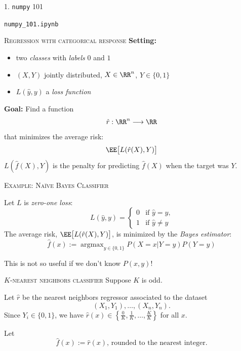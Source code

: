 \documentclass{beamer}
\DeclareMathOperator*{\argmax}{argmax}
\begin{document}
\begin{frame}{\textsc{1.} \texttt{numpy} \textsc{101}}
    
    \begin{center}
        \texttt{numpy\_101.ipynb}
    \end{center}
\end{frame}



\begin{frame}{\textsc{Regression with categorical response}}
    \textbf{Setting:}
    \begin{itemize}
        \item two \emph{classes} with \emph{labels} $0$ and $1$
        \item $(X, Y)$ jointly distributed, $X\in\RR^n$, $Y\in\{0,1\}$
        \item $L(\hat y, y)$ a \emph{loss function}
    \end{itemize}

    \textbf{Goal:}
    Find a function
    \[
        \hat{r}:\RR^n\longrightarrow \RR
    \]
    that minimizes the average risk:
    \[
        \EE\big[ L(\hat r(X), Y)\big]
    \]
    $L(\hat f(X), Y)$ is the penalty for predicting $\hat f(X)$ when the target was $Y$.
\end{frame}

\begin{frame}{\textsc{Example: Na\"ive Bayes Classifier}}

    Let $L$ is \emph{zero-one loss}:
    \[
        L(\hat y, y) = \begin{cases}
            0&\text{if $\hat y = y$,}\\
            1&\text{if $\hat y \neq y$}
        \end{cases}
    \]
    The average risk, $\EE\big[ L(\hat r(X), Y)\big]$, is minimized by the \emph{Bayes estimator}:
    \[
        \hat f(x) := \argmax_{y\in\{0,1\}}P(X=x|Y=y)P(Y=y)
    \]

    This is not so useful if we don't know $P(x, y)$!
\end{frame}

\begin{frame}{\textsc{$K$-nearest neighbors classifier}}
    Suppose $K$ is odd.

    Let $\hat r$ be the nearest neighbors regressor associated to the dataset
    \[
        (X_1, Y_1),\ldots, (X_n, Y_n).
    \]
    Since $Y_i\in\{0,1\}$, we have $\hat r(x)\in \left\{\frac0K, \frac1K,\ldots, \frac KK\right\}$ for all $x$.
    
    Let
    \[
        \hat f(x) := \text{$\hat r(x)$, rounded to the nearest integer}.
    \]
\end{frame}
\end{document}
